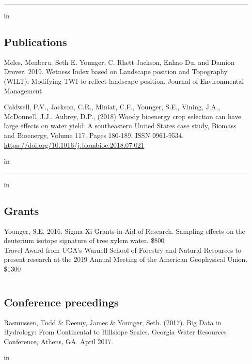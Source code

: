 \documentclass[10pt,letterpaper]{article}
\begin{document}
\pagebreak

\hrule
\vspace{-0.4em}
 in
\subsection*{Publications}

\begin{hangparas}{.25in}{1}

Meles, Menberu, Seth E. Younger, C. Rhett Jackson, Enhao Du, and Damion Drover. 2019. Wetness Index based on Landscape position and Topography (WILT): Modifying TWI to reflect landscape position. Journal of Environmental Management

Caldwell, P.V., Jackson, C.R., Miniat, C.F., Younger, S.E., Vining, J.A., McDonnell, J.J., Aubrey, D.P., (2018) Woody bioenergy crop selection can have large effects on water yield: A southeastern United States case study,
Biomass and Bioenergy, Volume 117, Pages 180-189, ISSN 0961-9534, \url{https://doi.org/10.1016/j.biombioe.2018.07.021}

 in
\vspace{-0.4em}

\end{hangparas}

\hrule
\vspace{-0.4em}
 in
\subsection*{Grants}

Younger, S.E. 2016. Sigma Xi Grants-in-Aid of Research. Sampling effects on the deuterium isotope signature of tree xylem water. \$800
\\
Travel Award from UGA's Warnell School of Forestry and Natural Resources to present research at the 2019 Annual Meeting of the American Geophysical Union. \$1300
\\

\hrule
\vspace{-0.4em}
\vskip 0.2in
\subsection*{Conference precedings}

\begin{hangparas}{.25in}{1}
	
	Rasmussen, Todd \& Deemy, James \& Younger, Seth. (2017). Big Data in Hydrology: From Continental to Hillslope Scales. Georgia Water Resources Conference, Athens, GA. April 2017.
	
 in

\end{hangparas}
\end{document}

